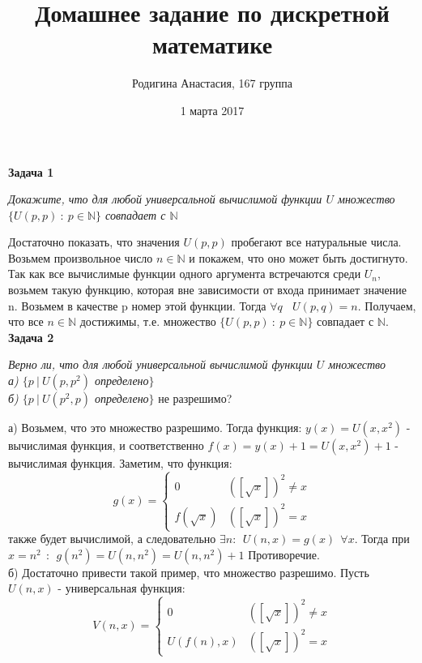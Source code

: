 \documentclass{article}
\title{Домашнее задание по дискретной математике}
\author{Родигина Анастасия, 167 группа}
\date{1 марта 2017}
\begin{document}
            

\maketitle  
 \noindent \textbf{Задача 1}
\begin{center} 
\textit{Докажите, что для любой универсальной вычислимой функции $U$ множество $\{U(p,p)~:~p \in \mathbb{N}\}$ совпадает с $\mathbb{N}$}
\end{center}
Достаточно показать, что значения $U(p,p)$ пробегают все натуральные числа. Возьмем произвольное число $n \in \mathbb{N}$ и покажем, что оно может быть достигнуто. Так как все вычислимые функции одного аргумента встречаются среди $U_n$, возьмем такую функцию, которая вне зависимости от входа принимает значение n. Возьмем в качестве p номер этой функции. Тогда $\forall q ~~~~U(p,q)=n$. Получаем, что все  $n \in \mathbb{N}$ достижимы, т.е. множество $\{U(p,p)~:~p \in \mathbb{N}\}$ совпадает с $\mathbb{N}$.
\newline
\newline
\textbf{Задача 2}
\begin{center}
\textit{Верно ли, что для любой универсальной вычислимой функции $U$ множество\\
а) $\{p~|~U(p,p^2)$ определено$ \}$\\
б) $\{p~|~U(p^2,p)$ определено$ \}$}
не разрешимо?
\end{center}
а) Возьмем, что это множество разрешимо. Тогда функция: $y(x)=U(x,x^2)$ - вычислимая функция, и соответственно $f(x)=y(x)+1=U(x,x^2)+1$ - вычислимая функция. Заметим, что функция:
\begin{equation*}
    g(x)=
    \begin{cases}
    0 & ([\sqrt{x}])^2 \neq x\\
    f(\sqrt{x}) & ([\sqrt{x}])^2 = x
    \end{cases}
\end{equation*}
 также будет вычислимой, а следовательно $\exists n :~~ U(n,x)=g(x)~~ \forall x$. Тогда при $x=n^2 ~~: ~~g(n^2) = U(n, n^2) = U (n, n^2) + 1$ Противоречие.\\
 б) Достаточно привести такой пример, что множество разрешимо. Пусть $U(n,x)$ - универсальная функция:
 \begin{equation*}
     V(n,x)=
     \begin{cases}
     0 & ([\sqrt{x}])^2 \neq x\\
     U(f(n),x) & ([\sqrt{x}])^2 = x
     \end{cases}
 \end{equation*}
\end{document}
